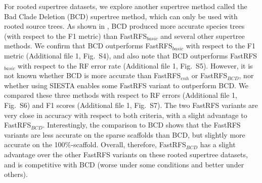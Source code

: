For rooted supertree datasets, we explore another supertree method called
 the Bad Clade Deletion (BCD) supertree method, which can only be used with rooted source trees.
 As shown in \cite{fleischauer2017bad}, BCD produced more accurate species trees (with respect to the F1 metric) than FastRFS$_{basic}$ and several other supertree methods.
 We confirm that BCD outperforms FastRFS$_{basic}$ with respect to the F1 metric (Additional file 1, Fig.~S4),  and also note that BCD outperforms FastRFS$_{basic}$ with respect to
the RF error rate   (Additional file 1, Fig.~S5).  
However, it is not known whether BCD is more accurate than FastRFS$_{enh}$ or FastRFS$_{BCD}$, nor whether using SIESTA enables some FastRFS variant  to outperform BCD. 
We compared these three methods with respect to RF errors (Additional file 1, Fig.~S6) and F1 scores (Additional file 1, Fig.~S7). 
The two FastRFS variants are very close in accuracy with respect to both criteria, with a slight advantage to FastRFS$_{BCD}$. 
Interestingly, the comparison to BCD shows that the FastRFS variants are less accurate on the sparse scaffolds than BCD, but slightly more accurate on the 100\%-scaffold.
Overall, therefore, FastRFS$_{BCD}$ has a slight advantage over the other FastRFS variants on these rooted supertree datasets, and is competitive with BCD (worse under some conditions
and better under others). 



